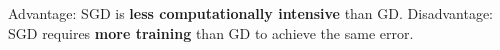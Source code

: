 Advantage: SGD is {\bf less computationally intensive} than GD. Disadvantage: SGD requires {\bf more training} than GD to achieve the same error.
